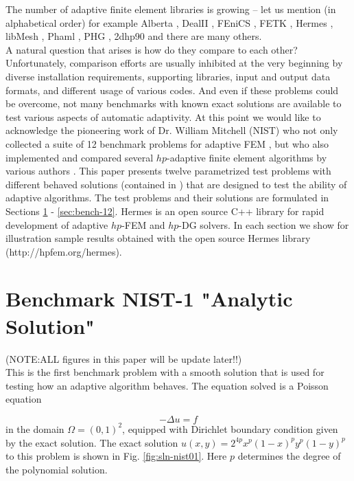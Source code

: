 \documentclass[12pt]{elsarticle}
\begin{document}
The number of adaptive finite element libraries is growing
-- let us mention (in alphabetical order) for example Alberta
\cite{alberta}, DealII \cite{dealii}, FEniCS
\cite{fenics}, FETK \cite{fetk}, Hermes \cite{hermes}, libMesh \cite{libmesh},
Phaml \cite{phaml}, PHG \cite{phg}, 2dhp90 \cite{2dhp90} and there are many others.\\
A natural question that arises is how do they compare to each other?
Unfortunately, comparison efforts are usually inhibited at the very beginning
by diverse installation requirements, supporting libraries, input and output
data formats, and different usage of various codes. And even if these problems
could be overcome, not many benchmarks with known exact solutions are
available to test various aspects of automatic adaptivity.
At this point we would like to acknowledge the pioneering work of Dr. William Mitchell
(NIST) who not only collected a suite of 12 benchmark problems
for adaptive FEM \cite{mitchell-1}, but who also implemented
and compared several $hp$-adaptive finite element algorithms by various
authors \cite{mitchell-2}.
This paper presents twelve parametrized test problems with different behaved 
solutions (contained in \cite{mitchell-1}) that are
designed to test the ability of adaptive algorithms.
The test problems and their
solutions are formulated in Sections \ref{sec:bench-1} - \ref{sec:bench-12}.
{\sc Hermes} is an open source C++ library for
rapid development of adaptive $hp$-FEM and $hp$-DG solvers.
In each section we show for illustration sample results obtained with the open
source {\sc Hermes} library (http://hpfem.org/hermes).

\section{Benchmark NIST-1 "Analytic Solution"}
\label{sec:bench-1}
(NOTE:ALL figures in this paper will be update later!!)\\

This is the first benchmark problem with a smooth solution
that is used for testing how an adaptive algorithm behaves.
The equation solved is a Poisson equation

\begin{equation} \label{poisson}
-\Delta u = f
\end{equation}
in the domain $\Omega = (0, 1)^2$, equipped with Dirichlet
boundary condition given by the exact solution.
The exact solution $u(x, y) = 2^{4p}x^{p}(1-x)^{p}y^{p}(1-y)^{p}$
to this problem is shown in Fig. \ref{fig:sln-nist01}.
Here $p$ determines the degree of the polynomial solution.
\end{document}
